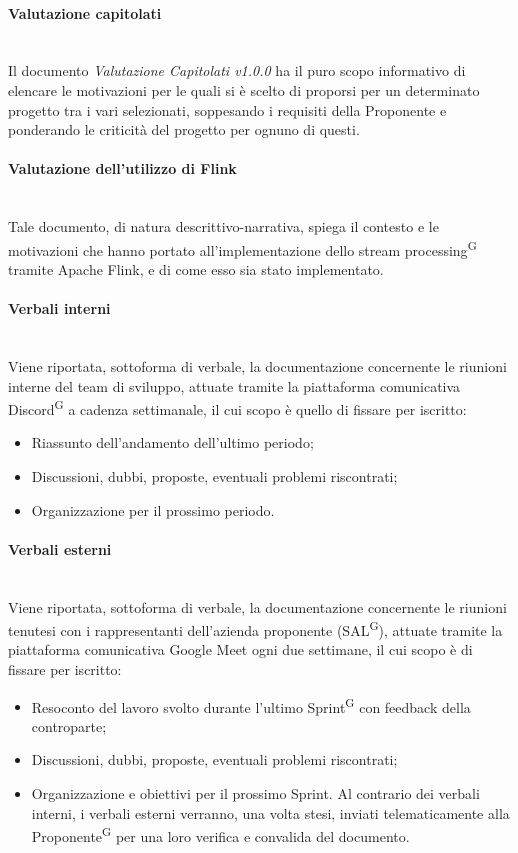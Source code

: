 \documentclass[8pt]{article}
\newcommand{\glossterm}[1]{#1\textsuperscript{G}} %
\newcommand{\subsubsubsection}[1]{\paragraph{#1}\mbox{}\\}
\begin{document}
\subsubsubsection{Valutazione capitolati}
Il documento \textit{Valutazione Capitolati v1.0.0} ha il puro scopo informativo di elencare le
motivazioni per le quali si è scelto di proporsi per un determinato progetto tra i vari selezionati,
soppesando i requisiti della Proponente e ponderando le criticità del progetto per ognuno di questi.  

\subsubsubsection{Valutazione dell'utilizzo di Flink}
Tale documento, di natura descrittivo-narrativa, spiega il contesto e le motivazioni che hanno portato all'implementazione dello \glossterm{stream processing} tramite Apache Flink, e di come esso sia stato implementato.

\subsubsubsection{Verbali interni}
Viene riportata, sottoforma di verbale, la documentazione concernente le riunioni interne del team
di sviluppo, attuate tramite la piattaforma comunicativa \glossterm{Discord} a cadenza settimanale,
il cui scopo è quello di fissare per iscritto:
\begin{itemize}
    \item Riassunto dell'andamento dell'ultimo periodo;
    \item Discussioni, dubbi, proposte, eventuali problemi riscontrati;
    \item Organizzazione per il prossimo periodo.
\end{itemize}
\subsubsubsection{Verbali esterni}
Viene riportata, sottoforma di verbale, la documentazione concernente le riunioni tenutesi con i
rappresentanti dell'azienda proponente (\glossterm{SAL}), attuate tramite la piattaforma comunicativa Google Meet ogni due settimane, il cui scopo è di fissare per iscritto:
\begin{itemize}
    \item Resoconto del lavoro svolto durante l'ultimo \glossterm{Sprint} con feedback della controparte;
    \item Discussioni, dubbi, proposte, eventuali problemi riscontrati;
    \item Organizzazione e obiettivi per il prossimo Sprint.
Al contrario dei verbali interni, i verbali esterni verranno, una volta stesi, inviati
        telematicamente alla \glossterm{Proponente} per una loro verifica e convalida del documento.
\end{itemize} 
\end{document}
